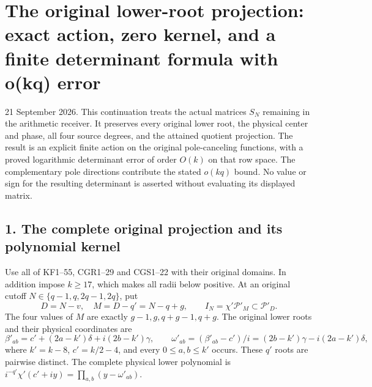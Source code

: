 \section{The original lower-root projection: exact action, zero kernel, and a finite determinant formula with o(kq) error}\label{the-original-lower-root-projection-exact-action-zero-kernel-and-a-finite-determinant-formula-with-okq-error}

21 September 2026. This continuation treats the actual matrices \(S_N\) remaining in the arithmetic receiver. It preserves every original lower root, the physical center and phase, all four source degrees, and the attained quotient projection. The result is an explicit finite action on the original pole-canceling functions, with a proved logarithmic determinant error of order \(O(k)\) on that row space. The complementary pole directions contribute the stated \(o(kq)\) bound. No value or sign for the resulting determinant is asserted without evaluating its displayed matrix.

\subsection{1. The complete original projection and its polynomial kernel}\label{the-complete-original-projection-and-its-polynomial-kernel}

Use all of KF1--55, CGR1--29 and CGS1--22 with their original domains. In addition impose \(k\ge17\), which makes all radii below positive. At an original cutoff \(N\in\{q-1,q,2q-1,2q\}\), put \[
D=N-v,\quad M=D-q'=N-q+g,\qquad
I_N=\chi'\mathcal P'_{M}\subset\mathcal P'_D.
\tag{CGP1}
\] The four values of \(M\) are exactly \(g-1,g,q+g-1,q+g\). The original lower roots and their physical coordinates are \[
\beta'_{ab}=c'+(2a-k')\delta+i(2b-k')\gamma,\qquad
\omega'_{ab}=(\beta'_{ab}-c')/i
=(2b-k')\gamma-i(2a-k')\delta,
\tag{CGP2}
\] where \(k'=k-8\), \(c'=k/2-4\), and every \(0\le a,b\le k'\) occurs. These \(q'\) roots are pairwise distinct. The complete physical lower polynomial is \(i^{-q'}\chi'(c'+iy)=\prod_{a,b}(y-\omega'_{ab})\).

